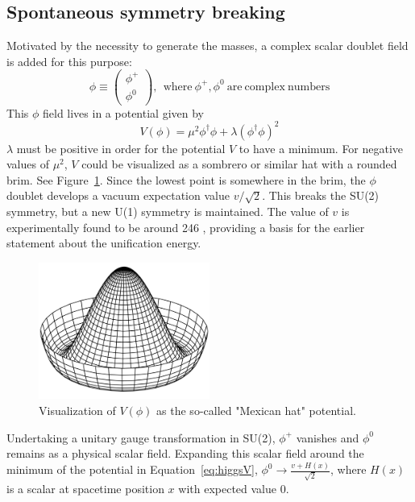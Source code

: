 \subsection{Spontaneous symmetry breaking}
\label{higgs}

Motivated by the necessity to generate the masses, a complex scalar doublet field is added for this purpose:
\begin{equation}
\phi \equiv \begin{pmatrix} \phi^+ \\ \phi^0 \end{pmatrix}, \:\:\mathrm{where~} \phi^+, \phi^0 \:\mathrm{are~complex~numbers}
\end{equation}
This $\phi$ field lives in a potential given by 
\begin{equation}
V(\phi) = \mu^2 \phi^\dagger \phi + \lambda (\phi^\dagger \phi)^2 \label{eq:higgsV}
\end{equation}
$\lambda$ must be positive in order for the potential $V$ to have a minimum.
For negative values of $\mu^2$, $V$ could be visualized as a sombrero or similar hat with a rounded brim. See Figure~\ref{fig:mexican_hat}.
Since the lowest point is somewhere in the brim, 
the $\phi$ doublet develops a vacuum expectation value $v/\sqrt{2}$.
This breaks the SU(2) symmetry, but a new U(1) symmetry is maintained.
The value of $v$ is experimentally found to be around 246 \GeV,
providing a basis for the earlier statement about the unification energy.

\begin{figure}
\centering
\includegraphics[width=0.5\textwidth]{figures/mexican_hat.png}
\caption{Visualization of $V(\phi)$ as the so-called "Mexican hat" potential.}
\label{fig:mexican_hat}
\end{figure}


Undertaking a unitary gauge transformation in SU(2), $\phi^+$ vanishes and $\phi^0$ remains as a physical scalar field.
Expanding this scalar field around the minimum of the potential in Equation~\ref{eq:higgsV}, $\phi^0 \rightarrow \frac{v+H(x)}{\sqrt{2}}$,
where $H(x)$ is a scalar at spacetime position $x$ with expected value 0.

